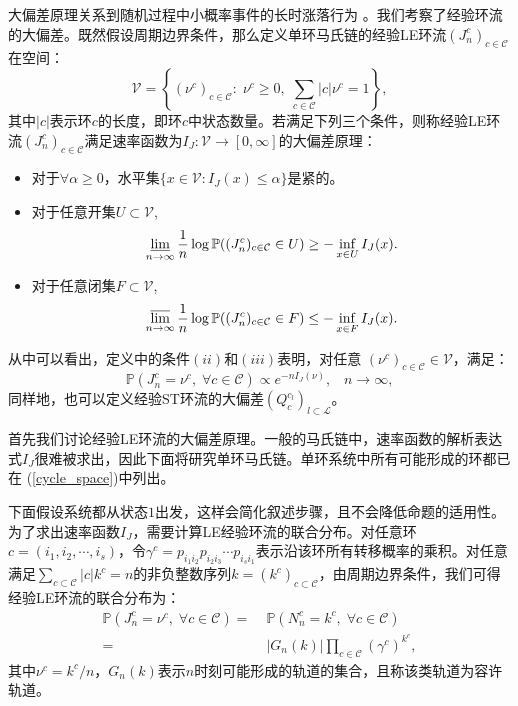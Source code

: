 大偏差原理关系到随机过程中小概率事件的长时涨落行为 \cite{varadhan1984large,den2000large}。我们考察了经验环流的大偏差。既然假设周期边界条件，那么定义单环马氏链的经验LE环流$(J_n^c)_{c \in \mathcal{C}}$在空间：
\begin{equation*}
    \mathcal{V} = \left\{(\nu^c)_{c\in \mathcal{C}}:\;\nu^c\geq 0,\;
    \sum_{c\in \mathcal{C}}|c|\nu^c  = 1\right\},
\end{equation*}
其中$|c|$表示环$c$的长度，即环$c$中状态数量。若满足下列三个条件\cite{varadhan1984large}，则称经验LE环流$(J_n^c)_{c \in \mathcal{C}}$满足速率函数为$I_J:\mathcal{V}\rightarrow [0,\infty]$的大偏差原理：
\begin{itemize}
    \item 对于$\forall \alpha \geqslant 0$，水平集$\{x \in \mathcal{V}: I_{J}(x) \leqslant \alpha\}$是紧的。
    \item 对于任意开集$U \subset \mathcal{V}$,
        \begin{equation}\label{def1}
            \varliminf_{n\to\infty}\frac{1}{n}\log\mathbb{P}((J^c_n)_{c\in\mathcal{C}}\in U)\ge-\inf_{x\in U}I_J(x).
        \end{equation}
    \item 对于任意闭集$F \subset \mathcal{V}$,
        \begin{equation}\label{def2}
            \varlimsup_{n\to \infty}\frac{1}{n}\log\mathbb{P}((J^c_n)_{c\in\mathcal{C}}\in F)\le -\inf_{x\in F}I_J(x).
        \end{equation}
\end{itemize}
从中可以看出，定义中的条件$(ii)$和$(iii)$表明，对任意 $(\nu^c)_{c\in\mathcal{C}}\in\mathcal{V}$，满足：
\begin{equation}\label{LDP}
    \mathbb{P}(J^c_n=\nu^c,\;\forall c\in\mathcal{C})\propto e^{-n I_J(\nu)},\;\;\;n\to\infty,
\end{equation}
同样地，也可以定义经验ST环流的大偏差$(Q_c^{c_l})_{l \subset \mathcal{L}}$。

首先我们讨论经验LE环流的大偏差原理。一般的马氏链中，速率函数的解析表达式$I_J$很难被求出，因此下面将研究单环马氏链。单环系统中所有可能形成的环都已在 (\ref{cycle_space})中列出。

下面假设系统都从状态$1$出发，这样会简化叙述步骤，且不会降低命题的适用性。为了求出速率函数$I_J$，需要计算LE经验环流的联合分布。对任意环$c=(i_1, i_2, \cdots, i_s)$，令$\gamma^c = p_{i_1i_2}p_{i_2i_3}\cdots p_{i_si_1}$表示沿该环所有转移概率的乘积。对任意满足$\sum_{c \subset \mathcal{C}} |c| k^c=n$的非负整数序列$k=(k^c)_{c\subset \mathcal{C}}$，由周期边界条件，我们可得经验LE环流的联合分布为：
\begin{equation}\label{joint}
    \begin{split}
    \mathbb{P}\left(J^c_n=\nu^c,\;\forall c\in\mathcal{C}\right)
    =&\;\mathbb{P}\left(N^c_n=k^c,\;\forall c\in\mathcal{C}\right)\\
    =&\;|G_n(k)|\prod_{c\in\mathcal{C}}\left(\gamma^c\right)^{k^c},
    \end{split}
\end{equation}
其中$\nu^c = k^c/n$，$G_n(k)$表示$n$时刻可能形成的轨道的集合，且称该类轨道为容许轨道。

